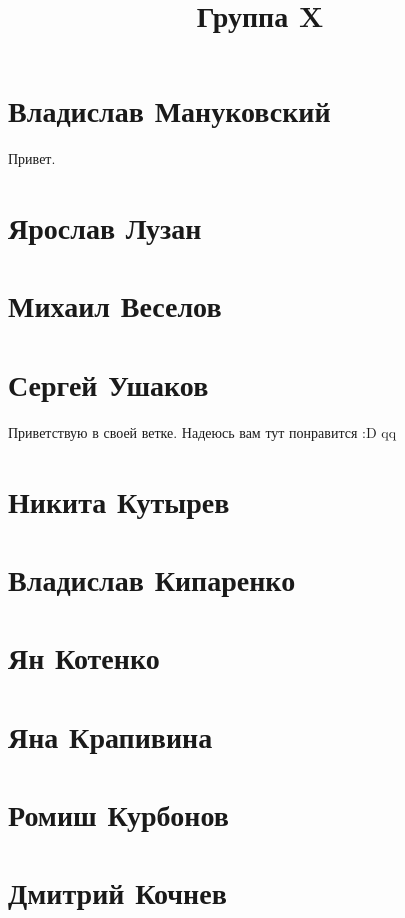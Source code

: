 \documentclass{article}
\title{Группа X}
\begin{document}
\section*{Владислав Мануковский}
Привет.
\section*{Ярослав Лузан}

\section*{Михаил Веселов}

\section*{Сергей Ушаков}

Приветствую в своей ветке. Надеюсь вам тут понравится :D qq

\section*{Никита Кутырев}

\section*{Владислав Кипаренко}

\section*{Ян Котенко}

\section*{Яна Крапивина}

\section*{Ромиш Курбонов}

\section*{Дмитрий Кочнев}
\end{document}
